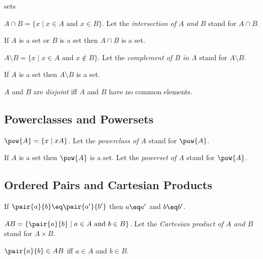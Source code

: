 \documentclass{article}
\begin{document}
\begin{smodule}{sets}
\begin{definition*}[forthel,id=IntersectionDef,printid]
  $A\cap B=\{x\mid x\in A\text{ and }x\in B\}$.
  Let the \emph{intersection of $A$ and $B$} stand for $A\cap B$.
\end{definition*}

\begin{proposition*}[forthel,id=IntersectionProp,printid]
  If $A$ is a set or $B$ is a set then $A\cap B$ is a set.
\end{proposition*}

\begin{definition*}[forthel,id=ComplementDef,printid]
  $A\setminus B=\{x\mid x\in A\text{ and }x\notin B\}$.
  Let the \emph{complement of $B$ in $A$} stand for $A\setminus B$.
\end{definition*}

\begin{proposition*}[forthel,id=ComplementProp,printid]
  If $A$ is a set then $A\setminus B$ is a set.
\end{proposition*}

\begin{definition*}[forthel,id=DisjointDef,printid]
  $A$ and $B$ are \emph{disjoint} iff $A$ and $B$ have no common elements.
\end{definition*}


\subsection{Powerclasses and Powersets}

\begin{definition*}[forthel,id=PowerclassDef,printid]
  $\pow{A}=\{x\mid x\subseteq A\}$.
  Let the \emph{powerclass of $A$} stand for $\pow{A}$.
\end{definition*}

\begin{axiom*}[forthel,title=Powerset Axiom,id=PowersetAx,printid]
  If $A$ is a set then $\pow{A}$ is a set.
  Let the \emph{powerset of $A$} stand for $\pow{A}$.
\end{axiom*}


\subsection{Ordered Pairs and Cartesian Products}

\begin{axiom*}[forthel,title=Pair Extensionality Axiom,id=PairExtensionalityAx,printid]
  If $\pair{a}{b}\eq \pair{a'}{b'}$ then $a\eq a'$ and $b\eq b'$.
\end{axiom*}

\begin{definition*}[forthel,id=CartesianProductDef,printid]
  $A\times B=\{\pair{a}{b}\mid a\in A\text{ and }b\in B\}$.
  Let the \emph{Cartesian product of $A$ and $B$} stand for $A\times B$.
\end{definition*}

\begin{proposition*}[forthel,id=CartesianProductProp,printid]
  $\pair{a}{b}\in A\times B$ iff $a\in A$ and $b\in B$.
\end{proposition*}
\end{smodule}
\end{document}
